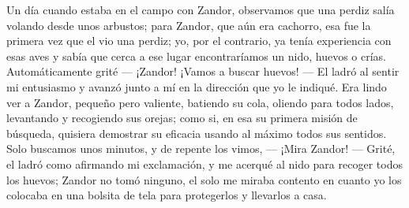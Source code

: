 Un día cuando estaba en el campo con Zandor, observamos que una perdiz salía volando desde unos arbustos; para Zandor, que aún era cachorro, esa fue la primera vez que el vio una perdiz; yo, por el contrario, ya tenía experiencia con esas aves y sabía que cerca a ese lugar encontraríamos un nido, huevos o crías.
Automáticamente grité --- ¡Zandor! ¡Vamos a buscar huevos! --- El ladró al sentir mi entusiasmo y avanzó junto a mí en la dirección que yo le indiqué.
Era lindo ver a Zandor, pequeño pero valiente, batiendo su cola, oliendo para todos lados, levantando y recogiendo sus orejas; como si, en esa su primera misión de búsqueda, quisiera demostrar su eficacia usando al máximo todos sus sentidos.
Solo buscamos unos minutos, y de repente los vimos, --- ¡Mira Zandor! --- Grité, el ladró como afirmando mi exclamación, y me acerqué al nido para recoger todos los huevos; Zandor no tomó ninguno, el solo me miraba contento en cuanto yo los colocaba en una bolsita de tela para protegerlos y llevarlos a casa.

